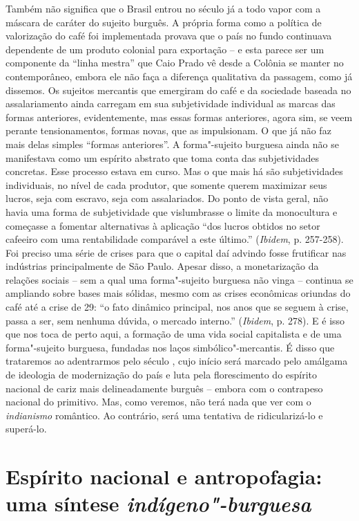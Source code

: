 Também não significa que o Brasil entrou no século  já a todo vapor
com a máscara de caráter do sujeito burguês. A própria forma como a
política de valorização do café foi implementada provava que o país no
fundo continuava dependente de um produto colonial para exportação -- e
esta parece ser um componente da ``linha mestra'' que Caio Prado vê
desde a Colônia se manter no contemporâneo, embora ele não faça a
diferença qualitativa da passagem, como já dissemos. Os sujeitos
mercantis que emergiram do café e da sociedade baseada no assalariamento
ainda carregam em sua subjetividade individual as marcas das formas
anteriores, evidentemente, mas essas formas anteriores, agora sim, se
veem perante tensionamentos, formas novas, que as impulsionam. O que já
não faz mais delas simples ``formas anteriores''. A forma"-sujeito
burguesa ainda não se manifestava como um espírito abstrato que toma
conta das subjetividades concretas. Esse processo estava em curso. Mas o
que mais há são subjetividades individuais, no nível de cada produtor,
que somente querem maximizar seus lucros, seja com escravo, seja com
assalariados. Do ponto de vista geral, não havia uma forma de
subjetividade que vislumbrasse o limite da monocultura e começasse a
fomentar alternativas à aplicação ``dos lucros obtidos no setor cafeeiro
com uma rentabilidade comparável a este último.'' (\emph{Ibidem}, p.
257-258). Foi preciso uma série de crises para que o capital daí advindo
fosse frutificar nas indústrias principalmente de São Paulo. Apesar
disso, a monetarização da relações sociais -- sem a qual uma
forma"-sujeito burguesa não vinga -- continua se ampliando sobre bases
mais sólidas, mesmo com as crises econômicas oriundas do café até a
crise de 29: ``o fato dinâmico principal, nos anos que se seguem à
crise, passa a ser, sem nenhuma dúvida, o mercado interno.''
(\emph{Ibidem}, p. 278). E é isso que nos toca de perto aqui, a formação
de uma vida social capitalista e de uma forma"-sujeito burguesa, fundadas
nos laços simbólico"-mercantis. É disso que trataremos ao adentrarmos
pelo século , cujo início será marcado pelo amálgama de ideologia de
modernização do país e luta pela florescimento do espírito nacional de
cariz mais delineadamente burguês -- embora com o contrapeso nacional do
primitivo. Mas, como veremos, não terá nada que ver com o
\emph{indianismo} romântico. Ao contrário, será uma tentativa de
ridicularizá-lo e superá-lo.

\section*{Espírito nacional e antropofagia: uma síntese \emph{indígeno"-burguesa}}

